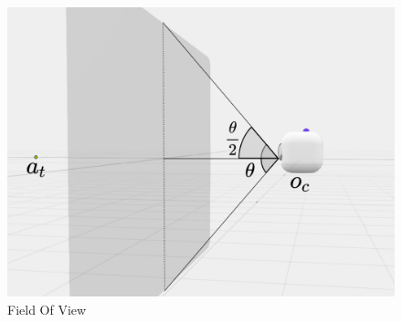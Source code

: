 \begin{figure} [ht]
    \centering
    \includegraphics[scale = 0.25]{img/C7/fov.png}
    \caption{Field Of View}
    \label{fig:fov}
\end{figure}

